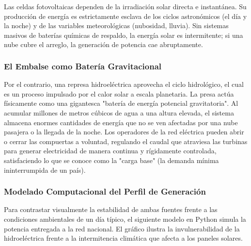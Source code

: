 \documentclass[12pt,a4paper]{article}
\begin{document}
Las celdas fotovoltaicas dependen de la irradiación solar directa e instantánea. Su producción de energía es estrictamente esclava de los ciclos astronómicos (el día y la noche) y de las variables meteorológicas (nubosidad, lluvia). Sin sistemas masivos de baterías químicas de respaldo, la energía solar es intermitente; si una nube cubre el arreglo, la generación de potencia cae abruptamente.

\subsubsection*{El Embalse como Batería Gravitacional}
Por el contrario, una represa hidroeléctrica aprovecha el ciclo hidrológico, el cual es un proceso impulsado por el calor solar a escala planetaria. La presa actúa físicamente como una gigantesca "batería de energía potencial gravitatoria". Al acumular millones de metros cúbicos de agua a una altura elevada, el sistema almacena enormes cantidades de energía que no se ven afectadas por una nube pasajera o la llegada de la noche. Los operadores de la red eléctrica pueden abrir o cerrar las compuertas a voluntad, regulando el caudal que atraviesa las turbinas para generar electricidad de manera continua y rígidamente controlada, satisfaciendo lo que se conoce como la "carga base" (la demanda mínima ininterrumpida de un país).

\subsubsection*{Modelado Computacional del Perfil de Generación}
Para contrastar visualmente la estabilidad de ambas fuentes frente a las condiciones ambientales de un día típico, el siguiente modelo en Python simula la potencia entregada a la red nacional. El gráfico ilustra la invulnerabilidad de la hidroeléctrica frente a la intermitencia climática que afecta a los paneles solares.
\end{document}
